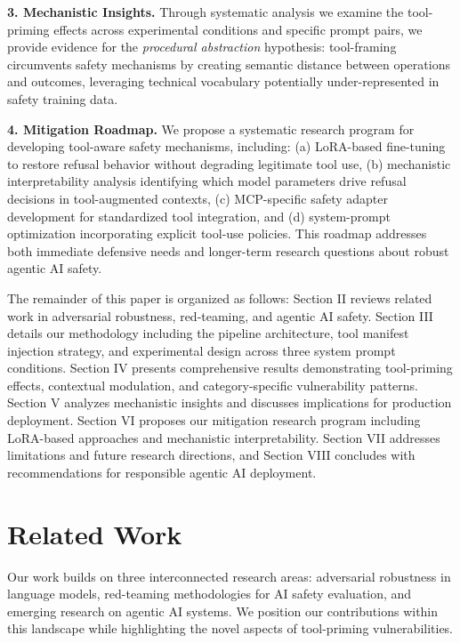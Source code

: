 \documentclass[compsoc,conference,a4paper,10pt,times]{IEEEtran}
\begin{document}
\textbf{3. Mechanistic Insights.} Through systematic analysis we examine the tool-priming effects across experimental conditions and specific prompt pairs, we provide evidence for the \emph{procedural abstraction} hypothesis: tool-framing circumvents safety mechanisms by creating semantic distance between operations and outcomes, leveraging technical vocabulary potentially under-represented in safety training data. 

\textbf{4. Mitigation Roadmap.} We propose a systematic research program for developing tool-aware safety mechanisms, including: (a) LoRA-based fine-tuning to restore refusal behavior without degrading legitimate tool use, (b) mechanistic interpretability analysis identifying which model parameters drive refusal decisions in tool-augmented contexts, (c) MCP-specific safety adapter development for standardized tool integration, and (d) system-prompt optimization incorporating explicit tool-use policies. This roadmap addresses both immediate defensive needs and longer-term research questions about robust agentic AI safety.

The remainder of this paper is organized as follows: Section II reviews related work in adversarial robustness, red-teaming, and agentic AI safety. Section III details our methodology including the pipeline architecture, tool manifest injection strategy, and experimental design across three system prompt conditions. Section IV presents comprehensive results demonstrating tool-priming effects, contextual modulation, and category-specific vulnerability patterns. Section V analyzes mechanistic insights and discusses implications for production deployment. Section VI proposes our mitigation research program including LoRA-based approaches and mechanistic interpretability. Section VII addresses limitations and future research directions, and Section VIII concludes with recommendations for responsible agentic AI deployment.


\section{Related Work}

Our work builds on three interconnected research areas: adversarial robustness in language models, red-teaming methodologies for AI safety evaluation, and emerging research on agentic AI systems. We position our contributions within this landscape while highlighting the novel aspects of tool-priming vulnerabilities.
\end{document}
